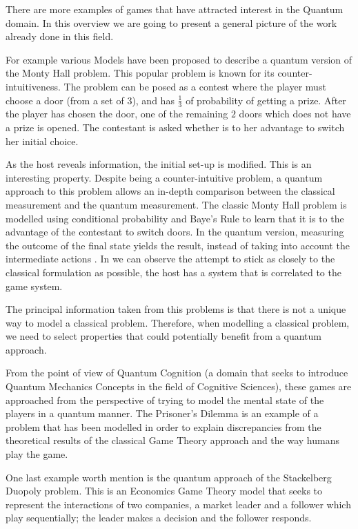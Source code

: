 There are more examples of games that have attracted interest in the Quantum domain. In this overview we are going to present a general picture of the work already done in this field.
 
For example various Models have been proposed to describe a quantum version of the Monty Hall problem\cite{Gill}\cite{Flitney2008}.
This popular problem\cite{Savant1990} is known for its counter-intuitiveness. The problem can be posed as a contest where the player must choose a door (from a set of $3$), and has $\frac{1}{3}$ of probability of getting a prize. After the player has chosen the door, one of the remaining $2$ doors which does not have a prize is opened. The contestant is asked whether is to her advantage to switch her initial choice.

As the host reveals information, the initial set-up is modified. This is an interesting property. Despite being a counter-intuitive problem, a quantum approach to this problem allows an in-depth comparison between the classical measurement and the quantum measurement. The classic Monty Hall problem is modelled using conditional probability and Baye's Rule to learn that it is to the advantage of the contestant to switch doors. In the quantum version, measuring the outcome of the final state yields the result, instead of taking into account the intermediate actions \cite{Fra2011}. In \cite{Gill2002} we can observe the attempt to stick as closely to the classical formulation as possible, the host has a system that is correlated to the game system.

The principal information taken from this problems is that there is not a unique way to model a classical problem\cite{Gill2002}. Therefore, when modelling a classical problem, we need to select properties that could potentially benefit from a quantum approach.

From the point of view of Quantum Cognition (a domain that seeks to introduce Quantum Mechanics Concepts in the field of Cognitive Sciences), these games are approached from the perspective of trying to model the mental state of the players in a quantum manner. The Prisoner's Dilemma is an example of a problem that has been modelled in order to explain discrepancies from the theoretical results of the classical Game Theory approach and the way humans play the game\cite{Pothos2009}. 

One last example worth mention is the quantum approach of the Stackelberg Duopoly problem\cite{Khan2011}\cite{Iqbal2008}. This is an Economics Game Theory model that seeks to represent the interactions of two companies, a market leader and a follower which play sequentially; the leader makes a decision and the follower responds. 


